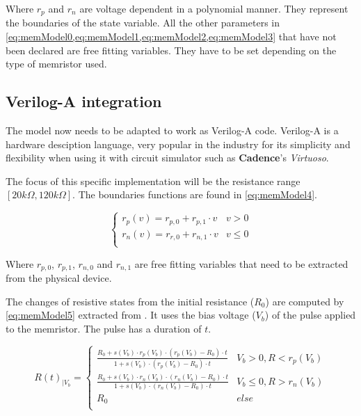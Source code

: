 Where $r_p$ and $r_n$ are voltage dependent in a polynomial manner. They represent the boundaries of the state variable. All the other parameters in \cref{eq:memModel0,eq:memModel1,eq:memModel2,eq:memModel3} that have not been declared are free fitting variables. They have to be set depending on the type of memristor used.

\subsection{Verilog-A integration}

The model now needs to be adapted to work as Verilog-A code.
Verilog-A is a hardware desciption language, very popular in the industry for its simplicity and flexibility when using it with circuit simulator such as \textbf{Cadence}'s \textit{Virtuoso}.

The focus of this specific implementation will be the resistance range $[20k\Omega, 120k\Omega]$. The boundaries functions are found in \cref{eq:memModel4}.

\begin{equation}\label{eq:memModel4}
  \begin{cases}
    r_p(v)= r_{p,0} + r_{p,1}\cdot v& v>0\\
    r_n(v)= r_{r,0} + r_{n,1}\cdot v& v\le 0\\
  \end{cases}
\end{equation}

Where $r_{p,0}$, $r_{p,1}$, $r_{n,0}$ and $r_{n,1}$ are free fitting variables that need to be extracted from the physical device.

The changes of resistive states from the initial resistance ($R_0$) are computed by \cref{eq:memModel5} extracted from \cite{memCadenceModel}. It uses the bias voltage ($V_b$) of the pulse applied to the memristor. The pulse has a duration of $t$.

\begin{equation}\label{eq:memModel5}
  R(t)_{|V_b} =
  \begin{cases}
    \frac{R_0+s(V_b)\cdot r_p(V_b)\cdot(r_p(V_b)-R_0)\cdot t}{1+s(V_b)\cdot (r_p(V_b)-R_0)\cdot t} & V_b>0, R<r_p(V_b)\\
    \frac{R_0+s(V_b)\cdot r_n(V_b)\cdot(r_n(V_b)-R_0)\cdot t}{1+s(V_b)\cdot (r_n(V_b)-R_0)\cdot t} & V_b\le 0, R>r_n(V_b)\\
    R_0 & else\\
  \end{cases}
\end{equation}

